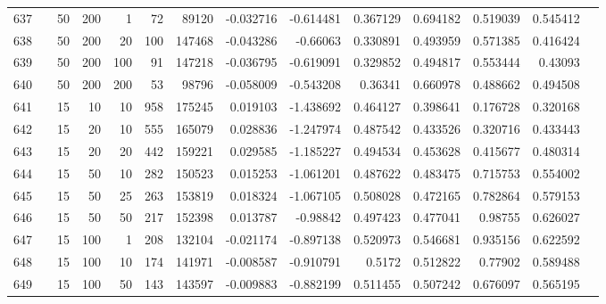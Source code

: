 \begin{longtable}{llrrrrrrrrrrrr}
		637 & &           50 &               200 &            1 &          72 &      89120 & -0.032716 & -0.614481 &  0.367129 &    0.694182 &       0.519039 &  0.545412 \\
		638 & &           50 &               200 &           20 &         100 &     147468 & -0.043286 &  -0.66063 &  0.330891 &    0.493959 &       0.571385 &  0.416424 \\
		639 & &           50 &               200 &          100 &          91 &     147218 & -0.036795 & -0.619091 &  0.329852 &    0.494817 &       0.553444 &   0.43093 \\
		640 & &           50 &               200 &          200 &          53 &      98796 & -0.058009 & -0.543208 &   0.36341 &    0.660978 &       0.488662 &  0.494508 \\\midrule
		641 & \multirow[t]{56}{*}{\rotatebox[origin=r]{90}{use-mean}} &           15 &                10 &           10 &         958 &     175245 &  0.019103 & -1.438692 &  0.464127 &    0.398641 &       0.176728 &  0.320168 \\
		642 & &           15 &                20 &           10 &         555 &     165079 &  0.028836 & -1.247974 &  0.487542 &    0.433526 &       0.320716 &  0.433443 \\
		643 & &           15 &                20 &           20 &         442 &     159221 &  0.029585 & -1.185227 &  0.494534 &    0.453628 &       0.415677 &  0.480314 \\
		644 & &           15 &                50 &           10 &         282 &     150523 &  0.015253 & -1.061201 &  0.487622 &    0.483475 &       0.715753 &  0.554002 \\
		645 & &           15 &                50 &           25 &         263 &     153819 &  0.018324 & -1.067105 &  0.508028 &    0.472165 &       0.782864 &  0.579153 \\
		646 & &           15 &                50 &           50 &         217 &     152398 &  0.013787 &  -0.98842 &  0.497423 &    0.477041 &        0.98755 &  0.626027 \\
		647 & &           15 &               100 &            1 &         208 &     132104 & -0.021174 & -0.897138 &  0.520973 &    0.546681 &       0.935156 &  0.622592 \\
		648 & &           15 &               100 &           10 &         174 &     141971 & -0.008587 & -0.910791 &    0.5172 &    0.512822 &        0.77902 &  0.589488 \\
		649 & &           15 &               100 &           50 &         143 &     143597 & -0.009883 & -0.882199 &  0.511455 &    0.507242 &       0.676097 &  0.565195 \\

\end{longtable}
